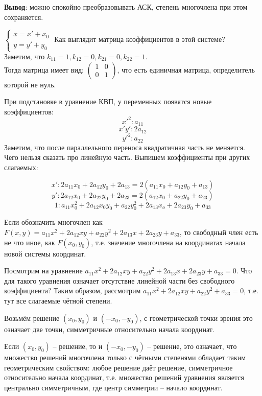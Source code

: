 \textbf{Вывод}: можно спокойно преобразовывать АСК, степень многочлена при этом сохраняется.

 $\begin{cases}
	x = x' + x_0 \\
	y = y' + y_0
 \end{cases}$ Как выглядит матрица коэффициентов в этой системе?\\
 Заметим, что $k_{11} = 1, k_{12} = 0, k_{21} = 0, k_{22} = 1$.\\
 Тогда матрица имеет вид:
 $\left( \begin{array}{cccc}
    1 & 0\\
	0 & 1
    \end{array}\right)$, что есть единичная матрица, определитель которой не нуль.

 При подстановке в уравнение КВП, у переменных появятся новые коэффициентов:
 $$x'^2 : a_{11}$$
 $$x'y': 2a_{12}$$
 $$y'^2: a_{22}$$
 Заметим, что после параллельного переноса квадратичная часть не меняется. Чего нельзя сказать про линейную часть. Выпишем коэффициенты при других слагаемых: 

 $$x': 2a_{11}x_0 + 2a_{12}y_0 + 2a_{13} = 2(a_{11}x_0 + a_{12}y_0 + a_{13})$$
 $$y': 2a_{12}x_0 + 2a_{22}y_0 + 2a_{23} = 2(a_{12}x_0 + a_{22}y_0 + a_{23})$$
 $$1: a_{11}x_0^2 + 2a_{12}x_0y_0 + a_{22}y_0^2 + 2a_{13}x_o + 2a_{23}y_0 + a_{33}$$
 
 Если обозначить многочлен как $F(x, y) = a_{11} x^2 + 2 a_{12}xy + a_{22} y^2 + 2 a_{13}x + 2 a_{23}y + a_{33}$, то свободный член есть не что иное, как $F(x_0, y_0)$, т.е. значение многочлена на координатах начала новой системы координат.

 Посмотрим на уравнение $a_{11} x^2 + 2 a_{12}xy + a_{22} y^2 + 2 a_{13}x + 2 a_{23}y + a_{33} = 0$.
 Что для такого уравнения означает отсутствие линейной части без свободного коэффициента? Таким образом, рассмотрим $a_{11} x^2 + 2 a_{12}xy + a_{22} y^2 + a_{33} = 0$, т.е. тут все слагаемые чётной степени.
 
 Возьмём решение $(x_0, y_0)$ и $(-x_0, -y_0)$, с геометрической точки зрения это означает две точки, симметричные относительно начала координат.
 
 Если $(x_0, y_0)$ -- решение, то и $(-x_0, -y_0)$ -- решение, это означает, что множество решений многочлена только с чётными степенями обладает таким геометрическим свойством: любое решение даёт решение, симметричное относительно начала координат, т.е. множество решений уравнения является центрально симметричным, где центр симметрии -- начало координат.

